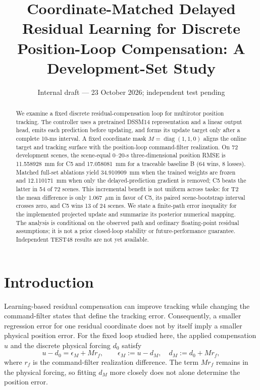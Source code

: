 \documentclass[11pt]{article}
\title{Coordinate-Matched Delayed Residual Learning for Discrete Position-Loop Compensation: A Development-Set Study}
\author{}
\date{Internal draft --- 23 October 2026; independent test pending}
\begin{document}
\maketitle

\begin{abstract}
We examine a fixed discrete residual-compensation loop for multirotor position tracking. The controller uses a pretrained DSSM14 representation and a linear output head, emits each prediction before updating, and forms its update target only after a complete 10-ms interval. A fixed coordinate mask $M=\operatorname{diag}(1,1,0)$ aligns the online target and tracking surface with the position-loop command-filter realization. On 72 development scenes, the scene-equal 0--20-s three-dimensional position RMSE is 11.558928~mm for C5 and 17.058081~mm for a traceable baseline B (64 wins, 8 losses). Matched full-set ablations yield 34.910909~mm when the trained weights are frozen and 12.110171~mm when only the delayed-prediction gradient is removed; C5 beats the latter in 54 of 72 scenes. This incremental benefit is not uniform across tasks: for T2 the mean difference is only 1.067~$\mu$m in favor of C5, its paired scene-bootstrap interval crosses zero, and C5 wins 13 of 24 scenes. We state a finite-path error inequality for the implemented projected update and summarize its posterior numerical mapping. The analysis is conditional on the observed path and ordinary floating-point residual assumptions; it is not a prior closed-loop stability or future-performance guarantee. Independent TEST48 results are not yet available.
\end{abstract}

\section{Introduction}
Learning-based residual compensation can improve tracking while changing the command-filter states that define the tracking error. Consequently, a smaller regression error for one residual coordinate does not by itself imply a smaller physical position error. For the fixed loop studied here, the applied compensation $u$ and the discrete physical forcing $d_0$ satisfy
\begin{equation}
  u-d_0 = \epsilon_M + M r_f, \qquad
  \epsilon_M := u-d_M, \quad d_M := d_0+M r_f,
  \label{eq:physical-coordinate}
\end{equation}
where $r_f$ is the command-filter realization difference. The term $M r_f$ remains in the physical forcing, so fitting $d_M$ more closely does not alone determine the position error.
\end{document}

